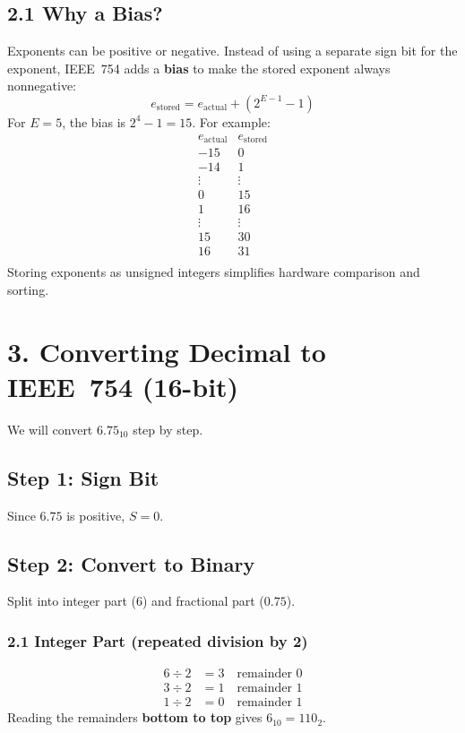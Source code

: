 \documentclass[12pt]{article}
\begin{document}
\subsection*{2.1 Why a Bias?}
Exponents can be positive or negative. Instead of using a separate sign bit for the exponent, IEEE~754 adds a \textbf{bias} to make the stored exponent always nonnegative:
\[
e_{\text{stored}} = e_{\text{actual}} + (2^{E-1}-1)
\]
For $E=5$, the bias is $2^{4}-1=15$. For example:
\[
\begin{array}{c|c}
e_{\text{actual}} & e_{\text{stored}} \\
\hline
-15 & 0 \\
-14 & 1 \\
\vdots & \vdots \\
0   & 15 \\
1   & 16 \\
\vdots & \vdots \\
15  & 30 \\
16  & 31 \\
\end{array}
\]
Storing exponents as unsigned integers simplifies hardware comparison and sorting.

\section*{3. Converting Decimal to IEEE~754 (16-bit)}
We will convert $6.75_{10}$ step by step.

\subsection*{Step 1: Sign Bit}
Since $6.75$ is positive, $S=0$.

\subsection*{Step 2: Convert to Binary}
Split into integer part (6) and fractional part ($0.75$).

\subsubsection*{2.1 Integer Part (repeated division by 2)}
\begin{align*}
6 \div 2 &= 3 \quad\text{remainder }0 \\
3 \div 2 &= 1 \quad\text{remainder }1 \\
1 \div 2 &= 0 \quad\text{remainder }1
\end{align*}
Reading the remainders \textbf{bottom to top} gives $6_{10} = 110_2$.
\end{document}

